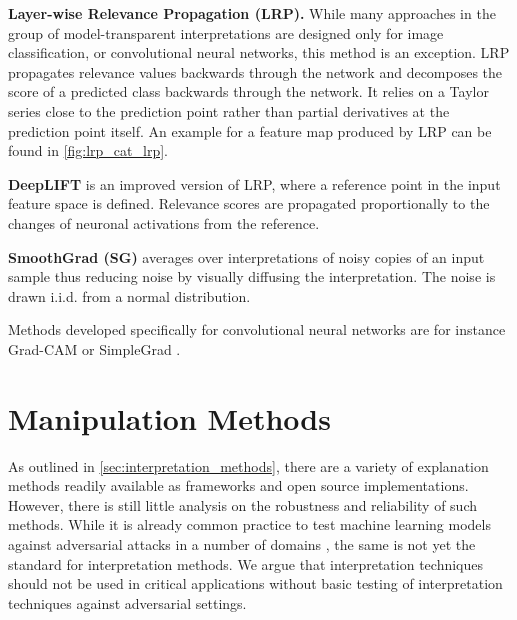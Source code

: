 \documentclass[sigconf]{acmart}
\newcommand{\mypar}[1]{\vspace{0.2cm}\noindent\textbf{#1}}
\begin{document}
\mypar{Layer-wise Relevance Propagation (LRP).} While many approaches in the group of model-transparent interpretations are designed only for image classification, or convolutional neural networks, this method \cite{bach2015pixel} is an exception. LRP propagates relevance values backwards through the network and decomposes the score of a predicted class backwards through the network. It relies on a Taylor series close to the prediction point rather than partial derivatives at the prediction point itself. An example for a feature map produced by LRP can be found in \autoref{fig:lrp_cat_lrp}.

\mypar{DeepLIFT} \cite{shrikumar2017learning} is an improved version of LRP, where a reference point in the input feature space is defined. Relevance scores are propagated proportionally to the changes of neuronal activations from the reference. %

\mypar{SmoothGrad (SG)} \cite{smilkov2017smoothgrad} averages over interpretations of noisy copies of an input sample thus reducing noise by visually diffusing the interpretation. The noise is drawn i.i.d. from a normal distribution. 

Methods developed specifically for convolutional neural networks are for instance Grad-CAM \cite{selvaraju2017grad} or SimpleGrad \cite{simonyan2013deep}.


% 
\section{Manipulation Methods}
\label{sec:manipulation_methods}

As outlined in \autoref{sec:interpretation_methods}, there are a variety of explanation methods readily available as frameworks and open source implementations. However, there is still little analysis on the robustness and reliability of such methods. 
While it is already common practice to test machine learning models against adversarial attacks in a number of domains \cite{gao2019universal, kereliuk2015deep}, the same is not yet the standard for interpretation methods. We argue that interpretation techniques should not be used in critical applications without basic testing of interpretation techniques against adversarial settings.
\end{document}
